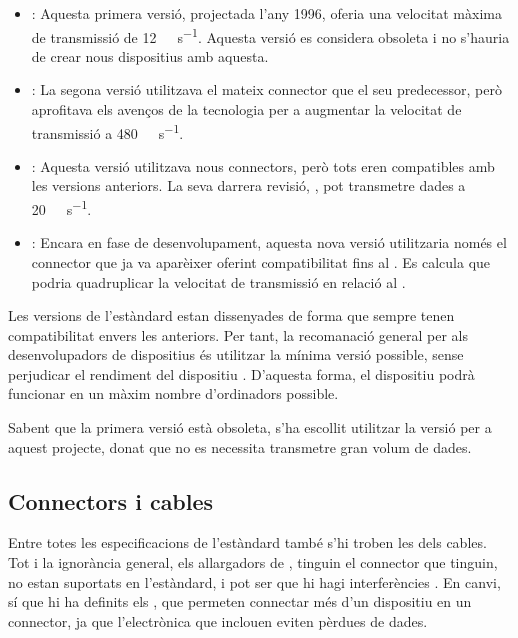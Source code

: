 \begin{itemize}
    \item {}: Aquesta primera versió, projectada l'any 1996, oferia
    una velocitat màxima de transmissió de
    \SI[round-mode=places,round-precision=0]{12}{\mega\bit\per\second}.
    Aquesta versió es considera obsoleta i no s'hauria de crear nous dispositius
    amb aquesta.
    \item {}: La segona versió utilitzava el mateix connector que el
    seu predecessor, però aprofitava els avenços de la tecnologia per a
    augmentar la velocitat de transmissió a
    \SI[round-mode=places,round-precision=0]{480}{\mega\bit\per\second}.
    \item {}: Aquesta versió utilitzava nous connectors, però tots
    eren compatibles amb les versions anteriors. La seva darrera revisió,
    , pot transmetre dades a
    \SI[round-mode=places,round-precision=0]{20}{\giga\bit\per\second}.
    \item {}: Encara en fase de desenvolupament, aquesta nova versió
    utilitzaria només el connector  que ja va aparèixer oferint
    compatibilitat fins al . Es calcula que podria quadruplicar
    la velocitat de transmissió en relació al .
\end{itemize}

Les versions de l'estàndard estan dissenyades de forma que sempre tenen
compatibilitat envers les anteriors. Per tant, la recomanació general per als
desenvolupadors de dispositius és utilitzar la mínima versió possible, sense
perjudicar el rendiment del dispositiu  \cite{Axelson2015USB}. D'aquesta forma,
el dispositiu podrà funcionar en un màxim nombre d'ordinadors possible.

Sabent que la primera versió està obsoleta, s'ha escollit utilitzar la versió
 per a aquest projecte, donat que no es necessita transmetre gran
volum de dades.

\subsection{Connectors i cables}

Entre totes les especificacions de l'estàndard  també s'hi troben les
dels cables. Tot i la ignorància general, els allargadors de , tinguin
el connector que tinguin, no estan suportats en l'estàndard, i pot ser que
hi hagi interferències \cite{Contributors2024USB}. En canvi, sí que
hi ha definits els , que permeten connectar més d'un dispositiu en un
connector, ja que l'electrònica que inclouen eviten pèrdues de dades.

